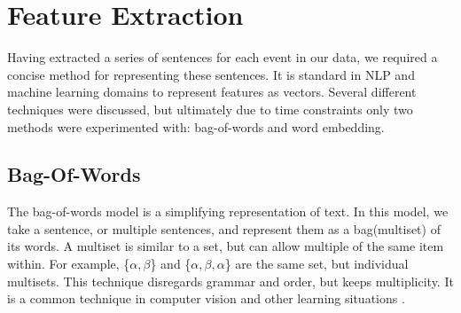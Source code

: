 \documentclass[bsc,frontabs,twoside,singlespacing,parskip,deptreport]{infthesis}     %
\begin{document}
\section{Feature Extraction}\label{sec:representation}
Having extracted a series of sentences for each event in our data, we required a concise method
for representing these sentences. It is standard in NLP and machine learning domains to represent features as vectors.
Several different techniques were discussed, but ultimately due to time constraints only two methods were
experimented with: bag-of-words and word embedding.
\subsection{Bag-Of-Words}
The bag-of-words model is a simplifying representation of text.
In this model, we take a sentence, or multiple sentences, and represent them as a bag(multiset) of its words.
A multiset is similar to a set, but can allow multiple of the same item within.
For example, \{$\alpha,\beta$\} and \{$\alpha,\beta,\alpha$\} are the same set, but individual multisets.
This technique disregards grammar and order, but keeps multiplicity. It is a common technique in computer vision
and other learning situations \cite{sivic2009efficient}.
\end{document}
